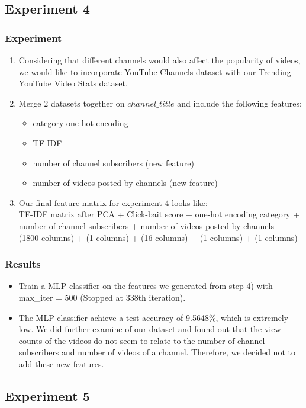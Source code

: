 \documentclass[english]{article}
\begin{document}
\subsection{Experiment 4}
\subsubsection{Experiment}
\begin{enumerate}
\item Considering that different channels would also affect the popularity of videos, we would like to incorporate YouTube Channels dataset with our Trending YouTube Video Stats dataset.
\item Merge 2 datasets together on $channel\_title$ and include the following features:
\begin{itemize}
    \item category one-hot encoding
    \item TF-IDF
    \item number of channel subscribers (new feature)
    \item number of videos posted by channels (new feature)
\end{itemize}
\item Our final feature matrix for experiment 4 looks like: \\
    TF-IDF matrix after PCA  + Click-bait score  + one-hot encoding category + number of channel subscribers + number of videos posted by channels \\
    (1800 columns) + (1 columns)  +  (16 columns) + (1 columns) + (1 columns) 
\end{enumerate}
\subsubsection{Results}
    \begin{itemize}
    \item Train a MLP classifier on the features we generated from step 4) with max\_iter = 500 (Stopped at 338th iteration).
    \item The MLP classifier achieve a test accuracy of 9.5648\%, which is extremely low. We did further examine of our dataset and found out that the view counts of the videos do not seem to relate to the number of channel subscribers and number of videos of a channel. Therefore, we decided not to add these new features.
\end{itemize}


\subsection{Experiment 5}
\end{document}

